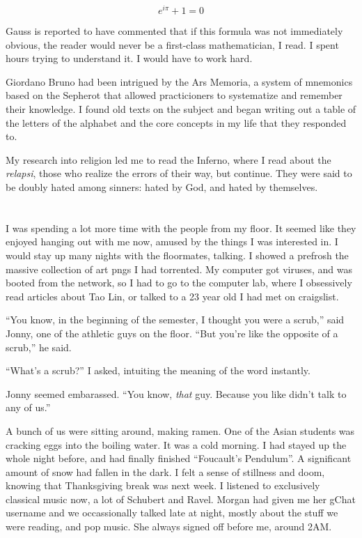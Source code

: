 \begin{equation}
  e^{i\pi} + 1 = 0
\end{equation}
      
Gauss is reported to have commented that if this formula was not immediately
obvious, the reader would never be a first-class mathematician, I read.  I spent
hours trying to understand it.  I would have to work hard.

Giordano Bruno had been intrigued by the Ars Memoria, a system of mnemonics
based on the Sepherot that allowed practicioners to systematize and remember
their knowledge.  I found old texts on the subject and began writing out a table
of the letters of the alphabet and the core concepts in my life that they
responded to.

My research into religion led me to read the Inferno, where I read about the 
\textit{relapsi}, those who realize the errors of their way, but continue.  They
were said to be doubly hated among sinners: hated by God, and hated by
themselves.


\section{}

I was spending a lot more time with the people from my floor.  It seemed like
they enjoyed hanging out with me now, amused by the things I was interested in.
I would stay up many nights with the floormates, talking.  I showed a prefrosh
the massive collection of art pngs I had torrented.  My computer got viruses,
and was booted from the network, so I had to go to the computer lab, where I
obsessively read articles about Tao Lin, or talked to a 23 year old I had met on
craigslist.  

``You know, in the beginning of the semester, I thought you were a scrub,'' said
Jonny, one of the athletic guys on the floor.  ``But you're like the opposite of
a scrub,'' he said.  

``What's a scrub?''  I asked, intuiting the meaning of the word instantly.

Jonny seemed embarassed.  ``You know, \textit{that} guy.  Because you like
didn't talk to any of us.''  

A bunch of us were sitting around, making ramen.  One of the Asian students was
cracking eggs into the boiling water.  It was a cold morning.  I had stayed up
the whole night before, and had finally finished ``Foucault's Pendulum''.  A
significant amount of snow had fallen in the dark.  I felt a sense of stillness
and doom, knowing that Thanksgiving break was next week.  I listened to
exclusively classical music now, a lot of Schubert and Ravel.  Morgan had given
me her gChat username and we occassionally talked late at night, mostly about
the stuff we were reading, and pop music.  She always signed off before me,
around 2AM.


